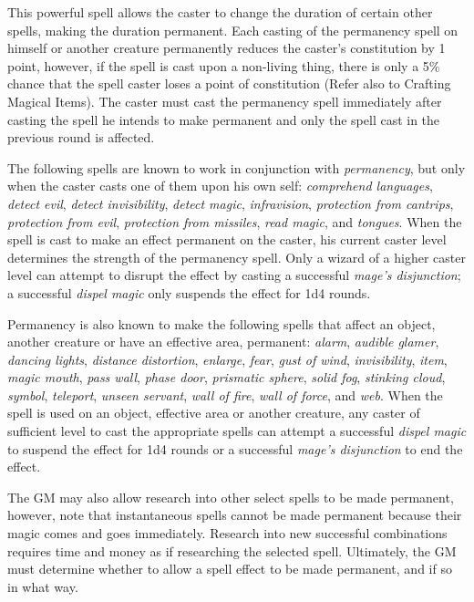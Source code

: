 \begin{multicols}{2}
This powerful spell allows the caster to change the duration of certain other spells, making the duration permanent.  Each casting of the permanency spell on himself or another creature permanently reduces the caster's constitution by 1 point, however, if the spell is cast upon a non-living thing, there is only a 5\% chance that the spell caster loses a point of constitution (Refer also to Crafting Magical Items).  The caster must cast the permanency spell immediately after casting the spell he intends to make permanent and only the spell cast in the previous round is affected.

The following spells are known to work in conjunction with \textit{permanency}, but only when the caster casts one of them upon his own self: \textit{comprehend languages}, \textit{detect evil}, \textit{detect invisibility}, \textit{detect magic}, \textit{infravision}, \textit{protection from cantrips}, \textit{protection from evil}, \textit{protection from missiles}, \textit{read magic}, and \textit{tongues}.  When the spell is cast to make an effect permanent on the caster, his current caster level determines the strength of the permanency spell.  Only a wizard of a higher caster level can attempt to disrupt the effect by casting a successful \textit{mage's disjunction}; a successful \textit{dispel magic} only suspends the effect for 1d4 rounds.

Permanency is also known to make the following spells that affect an object, another creature or have an effective area, permanent: \textit{alarm}, \textit{audible glamer}, \textit{dancing lights}, \textit{distance distortion}, \textit{enlarge}, \textit{fear}, \textit{gust of wind}, \textit{invisibility}, \textit{item}, \textit{magic mouth}, \textit{pass wall}, \textit{phase door}, \textit{prismatic sphere}, \textit{solid fog}, \textit{stinking cloud}, \textit{symbol}, \textit{teleport}, \textit{unseen servant}, \textit{wall of fire}, \textit{wall of force}, and \textit{web}.  When the spell is used on an object, effective area or another creature, any caster of sufficient level to cast the appropriate spells can attempt a successful \textit{dispel magic} to suspend the effect for 1d4 rounds or a successful \textit{mage's disjunction} to end the effect.
 
The GM may also allow research into other select spells to be made permanent, however, note that instantaneous spells cannot be made permanent because their magic comes and goes immediately.  Research into new successful combinations requires time and money as if researching the selected spell.  Ultimately, the GM must determine whether to allow a spell effect to be made permanent, and if so in what way.


\end{multicols}
